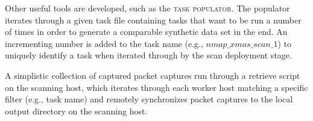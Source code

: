 Other useful tools are developed, such as the \textsc{task populator}. The populator iterates through a given task file containing tasks that want to be run a number of times in order to generate a comparable synthetic data set in the end. An incrementing number is added to the task name (e.g., $nmap\_xmas\_scan\_1$) to uniquely identify a task when iterated through by the scan deployment stage.

A simplistic collection of captured packet captures run through a retrieve script on the scanning host, which iterates through each worker host matching a specific filter (e.g., task name) and remotely synchronizes packet captures to the local output directory on the scanning host.